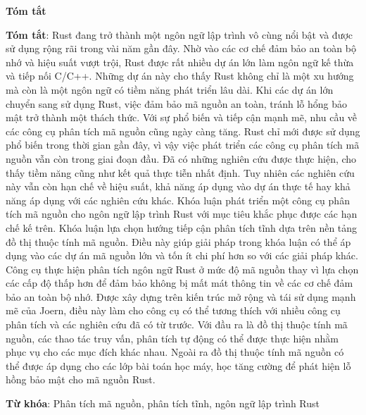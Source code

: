 \begin{center}
\textbf{\large{Tóm tắt}}
\end{center}


\begin{small}
\textbf{Tóm tắt}: Rust đang trở thành một ngôn ngữ lập trình vô cùng nổi bật và được sử dụng rộng rãi trong vài năm gần đây.
Nhờ vào các cơ chế đảm bảo an toàn bộ nhớ và hiệu suất vượt trội, Rust được rất nhiều dự án lớn làm ngôn ngữ kế thừa và tiếp nối C/C++.
Những dự án này cho thấy Rust không chỉ là một xu hướng mà còn là một ngôn ngữ có tiềm năng phát triển lâu dài.
Khi các dự án lớn chuyển sang sử dụng Rust, việc đảm bảo mã nguồn an toàn, tránh lỗ hổng bảo mật trở thành một thách thức.
Với sự phổ biến và tiếp cận mạnh mẽ, nhu cầu về các công cụ phân tích mã nguồn cũng ngày càng tăng.
Rust chỉ mới được sử dụng phổ biến trong thời gian gần đây, vì vậy việc phát triển các công cụ phân tích mã nguồn vẫn còn trong giai đoạn đầu.
Đã có những nghiên cứu được thực hiện, cho thấy tiềm năng cũng như kết quả thực tiễn nhất định.
Tuy nhiên các nghiên cứu này vẫn còn hạn chế về hiệu suất, khả năng áp dụng vào dự án thực tế hay khả năng áp dụng với các nghiên cứu khác.
Khóa luận phát triển một công cụ phân tích mã nguồn cho ngôn ngữ lập trình Rust với mục tiêu khắc phục được các hạn chế kế trên.
Khóa luận lựa chọn hướng tiếp cận phân tích tĩnh dựa trên nền tảng đồ thị thuộc tính mã nguồn.
Điều này giúp giải pháp trong khóa luận có thể áp dụng vào các dự án mã nguồn lớn và tốn ít chi phí hơn so với các giải pháp khác.
Công cụ thực hiện phân tích ngôn ngữ Rust ở mức độ mã nguồn thay vì lựa chọn các cấp độ thấp hơn để đảm bảo không bị mất mát thông tin về các cơ chế đảm bảo an toàn bộ nhớ.
Được xây dựng trên kiến trúc mở rộng và tái sử dụng mạnh mẽ của Joern, điều này làm cho công cụ có thể tương thích với nhiều công cụ phân tích và các nghiên cứu đã có từ trước.
Với đầu ra là đồ thị thuộc tính mã nguồn, các thao tác truy vấn, phân tích tự động có thể được thực hiện nhằm phục vụ cho các mục đích khác nhau.
Ngoài ra đồ thị thuộc tính mã nguồn có thể được áp dụng cho các lớp bài toán học máy, học tăng cường để phát hiện lỗ hồng bảo mật cho mã nguồn Rust.

\vspace*{1cm}
\textbf{Từ khóa}: Phân tích mã nguồn, phân tích tĩnh, ngôn ngữ lập trình Rust

\end{small}